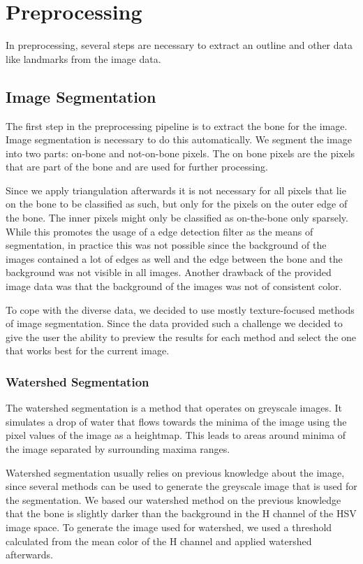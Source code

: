 \documentclass[pdftex,12pt,a4paper]{report}
\begin{document}
\section{Preprocessing}

In preprocessing, several steps are necessary to extract an outline and other data like landmarks from the image data.

\subsection{Image Segmentation}
\label{sub:segmentation}

The first step in the preprocessing pipeline is to extract the bone for the image. Image segmentation
is necessary to do this automatically. We segment the image into two parts: on-bone and not-on-bone pixels.
The on bone pixels are the pixels that are part of the bone and are used for further processing.

Since we apply triangulation afterwards it is not necessary for all pixels that lie on the bone
to be classified as such, but only for the pixels on the outer edge of the bone. The inner pixels
might only be classified as on-the-bone only sparsely. While this promotes the usage of a edge detection
filter as the means of segmentation, in practice this was not possible since the background of the
images contained a lot of edges as well and the edge between the bone and the background was not
visible in all images. Another drawback of the provided image data was that the background of the images
was not of consistent color.

To cope with the diverse data, we decided to use mostly texture-focused methods of image segmentation. Since the data provided such a challenge we decided to give the user the ability to preview the results for each method and select the one that works best for the current image.

\subsubsection{Watershed Segmentation}
\label{subsub:segmentationwatershed}

The watershed segmentation is a method that operates on greyscale images. It simulates a drop of water that flows towards the minima of the image using the pixel values of the image as a heightmap. This leads to areas around minima of the image separated by surrounding maxima ranges.

Watershed segmentation usually relies on previous knowledge about the image, since several methods can be used to generate the greyscale image that is used for the segmentation. We based our watershed method on the previous knowledge that the bone is slightly darker than the background in the H channel of the HSV image space. To generate the image used for watershed, we used a threshold calculated from the mean color of the H channel and applied watershed afterwards.
\end{document}
